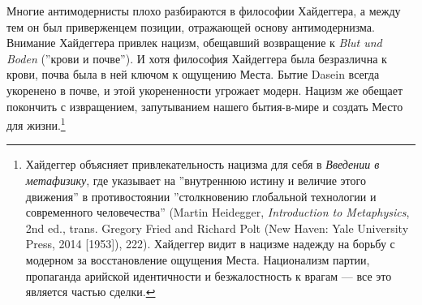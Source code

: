 \documentclass[12pt]{book}
\begin{document}
Многие антимодернисты плохо разбираются в философии Хайдеггера, а между тем он был приверженцем позиции, отражающей основу антимодернизма. Внимание Хайдеггера привлек нацизм, обещавший возвращение к \textit{Blut und Boden} (''крови и почве''). И хотя философия Хайдеггера была безразлична к крови, почва была в ней ключом к ощущению Места. Бытие Dasein всегда укоренено в почве, и этой укорененности угрожает модерн. Нацизм же обещает покончить с извращением, запутыванием нашего бытия-в-мире и создать Место для жизни.\footnote{Хайдеггер объясняет привлекательность нацизма для себя в \textit{Введении в метафизику}, где указывает на ''внутреннюю истину и величие этого движения'' в противостоянии ''столкновению глобальной технологии и современного человечества'' (Martin Heidegger, \textit{Introduction to Metaphysics}, 2nd ed., trans. Gregory Fried and Richard Polt (New Haven: Yale University Press, 2014 [1953]), 222). Хайдеггер видит в нацизме надежду на борьбу с модерном за восстановление ощущения Места. Национализм партии, пропаганда арийской идентичности и безжалостность к врагам --- все это является частью сделки.}
\end{document}
